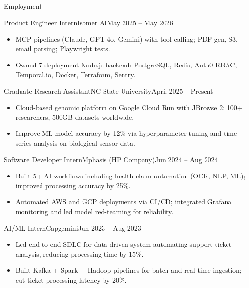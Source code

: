 \documentclass[]{mcdowellcv}
\begin{document}
\makeheader

\begin{cvsection}{Employment}
  \begin{cvsubsection}{Product Engineer Intern}{Isomer AI}{May 2025 -- May 2026}
    \begin{itemize}
      \item MCP pipelines (Claude, GPT-4o, Gemini) with tool calling; PDF gen, S3, email parsing; Playwright tests.
      \item Owned 7-deployment Node.js backend: PostgreSQL, Redis, Auth0 RBAC, Temporal.io, Docker, Terraform, Sentry.
    \end{itemize}
    \vspace{-1.5pt}
  \end{cvsubsection}

  \begin{cvsubsection}{Graduate Research Assistant}{NC State University}{April 2025 -- Present}
    \begin{itemize}
      \item Cloud-based genomic platform on Google Cloud Run with JBrowse 2; 100+ researchers, 500GB datasets worldwide.
      \item Improve ML model accuracy by 12\% via hyperparameter tuning and time-series analysis on biological sensor data.
    \end{itemize}
    \vspace{-1.5pt}
  \end{cvsubsection}

  \begin{cvsubsection}{Software Developer Intern}{Mphasis (HP Company)}{Jun 2024 -- Aug 2024}
    \begin{itemize}
      \item Built 5+ AI workflows including health claim automation (OCR, NLP, ML); improved processing accuracy by 25\%.
      \item Automated AWS and GCP deployments via CI/CD; integrated Grafana monitoring and led model red-teaming for reliability.
    \end{itemize}
    \vspace{-1.5pt}
  \end{cvsubsection}

  \begin{cvsubsection}{AI/ML Intern}{Capgemini}{Jun 2023 -- Aug 2023}
    \begin{itemize}
      \item Led end-to-end SDLC for data-driven system automating support ticket analysis, reducing processing time by 15\%.
      \item Built Kafka + Spark + Hadoop pipelines for batch and real-time ingestion; cut ticket-processing latency by 20\%.
    \end{itemize}
    \vspace{-1.5pt}
  \end{cvsubsection}
\end{cvsection}
\end{document}
